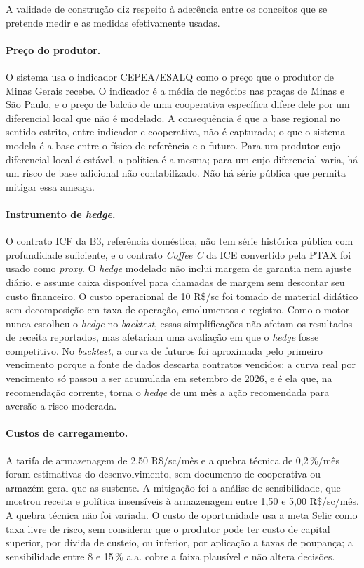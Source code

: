 A validade de construção diz respeito à aderência entre os conceitos que se pretende medir e as medidas efetivamente usadas.

\paragraph{Preço do produtor.} O sistema usa o indicador CEPEA/ESALQ como o preço que o produtor de Minas Gerais recebe. O indicador é a média de negócios nas praças de Minas e São Paulo, e o preço de balcão de uma cooperativa específica difere dele por um diferencial local que não é modelado. A consequência é que a base regional no sentido estrito, entre indicador e cooperativa, não é capturada; o que o sistema modela é a base entre o físico de referência e o futuro. Para um produtor cujo diferencial local é estável, a política é a mesma; para um cujo diferencial varia, há um risco de base adicional não contabilizado. Não há série pública que permita mitigar essa ameaça.

\paragraph{Instrumento de \textit{hedge}.} O contrato ICF da B3, referência doméstica, não tem série histórica pública com profundidade suficiente, e o contrato \textit{Coffee C} da ICE convertido pela PTAX foi usado como \textit{proxy}. O \textit{hedge} modelado não inclui margem de garantia nem ajuste diário, e assume caixa disponível para chamadas de margem sem descontar seu custo financeiro. O custo operacional de 10 R\$/sc foi tomado de material didático \cite{AgroSafety2026} sem decomposição em taxa de operação, emolumentos e registro. Como o motor nunca escolheu o \textit{hedge} no \textit{backtest}, essas simplificações não afetam os resultados de receita reportados, mas afetariam uma avaliação em que o \textit{hedge} fosse competitivo. No \textit{backtest}, a curva de futuros foi aproximada pelo primeiro vencimento porque a fonte de dados descarta contratos vencidos; a curva real por vencimento só passou a ser acumulada em setembro de 2026, e é ela que, na recomendação corrente, torna o \textit{hedge} de um mês a ação recomendada para aversão a risco moderada.

\paragraph{Custos de carregamento.} A tarifa de armazenagem de 2,50 R\$/sc/mês e a quebra técnica de 0,2\,\%/mês foram estimativas do desenvolvimento, sem documento de cooperativa ou armazém geral que as sustente. A mitigação foi a análise de sensibilidade, que mostrou receita e política insensíveis à armazenagem entre 1,50 e 5,00 R\$/sc/mês. A quebra técnica não foi variada. O custo de oportunidade usa a meta Selic como taxa livre de risco, sem considerar que o produtor pode ter custo de capital superior, por dívida de custeio, ou inferior, por aplicação a taxas de poupança; a sensibilidade entre 8 e 15\,\% a.a. cobre a faixa plausível e não altera decisões.


